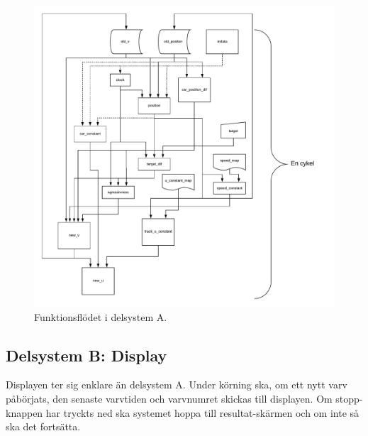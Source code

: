     \begin{figure}
      \centering
      \includegraphics[width=\linewidth]{figures/flow.pdf}
      \caption{Funktionsflödet i delsystem A.}%
      \label{fig:flow_diagram}
    \end{figure}

  \subsection{Delsystem B: Display}

  Displayen ter sig enklare än delsystem A. Under körning ska, om ett nytt varv
  påbörjats, den senaste varvtiden och varvnumret skickas till displayen. Om
  stopp-knappen har tryckts ned ska systemet hoppa till resultat-skärmen och om
  inte så ska det fortsätta.


